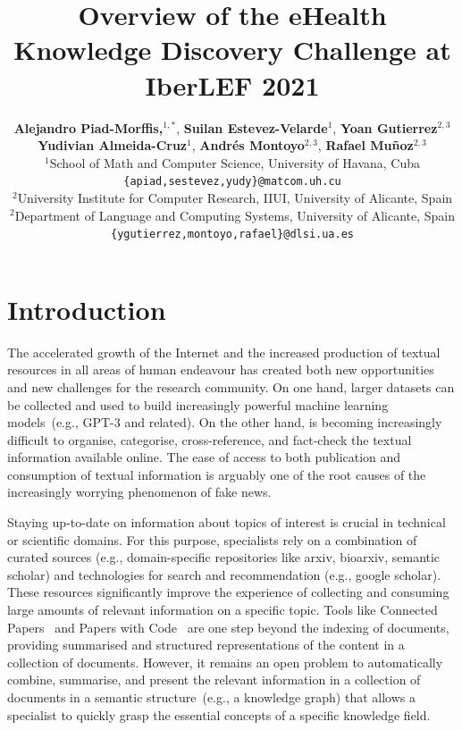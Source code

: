 \documentclass[a4paper,11pt,twocolumn,twoside]{article}
\title{Overview of the eHealth Knowledge Discovery Challenge at IberLEF 2021}
\author {
  \textbf{Alejandro Piad-Morffis,$^{1,*}$},
  \textbf{Suilan Estevez-Velarde$^1$},
  \textbf{Yoan Gutierrez$^{2,3}$}\\
  \textbf{Yudivian Almeida-Cruz$^1$},
  \textbf{Andrés Montoyo$^{2,3}$},
  \textbf{Rafael Muñoz$^{2,3}$}\\
$^1$School of Math and Computer Science, University of Havana, Cuba\\
\texttt{\{apiad,sestevez,yudy\}@matcom.uh.cu}\\
$^2$University Institute for Computer Research, IIUI, University of Alicante, Spain\\
$^2$Department of Language and Computing Systems, University of Alicante, Spain\\
\texttt{\{ygutierrez,montoyo,rafael\}@dlsi.ua.es}\\
}
\begin{document}


\label{firstpage} \maketitle

%

\section{Introduction}


The accelerated growth of the Internet and the increased production of textual resources in all areas of human endeavour has created both new opportunities and new challenges for the research community.
On one hand, larger datasets can be collected and used to build increasingly powerful machine learning models~(e.g., GPT-3 and related).
On the other hand, is becoming increasingly difficult to organise, categorise, cross-reference, and fact-check the textual information available online.
The ease of access to both publication and consumption of textual information is arguably one of the root causes of the increasingly worrying phenomenon of fake news.

Staying up-to-date on information about topics of interest is crucial in technical or scientific domains.
For this purpose, specialists rely on a combination of curated sources (e.g., domain-specific repositories like arxiv, bioarxiv, semantic scholar) and technologies for search and recommendation (e.g., google scholar).
These resources significantly improve the experience of collecting and consuming large amounts of relevant information on a specific topic.
Tools like Connected Papers~\cite{} and Papers with Code~\cite{} are one step beyond the indexing of documents, providing summarised and structured representations of the content in a collection of documents.
However, it remains an open problem to automatically combine, summarise, and present the relevant information in a collection of documents in a semantic structure~(e.g., a knowledge graph) that allows a specialist to quickly grasp the essential concepts of a specific knowledge field.
\end{document}
